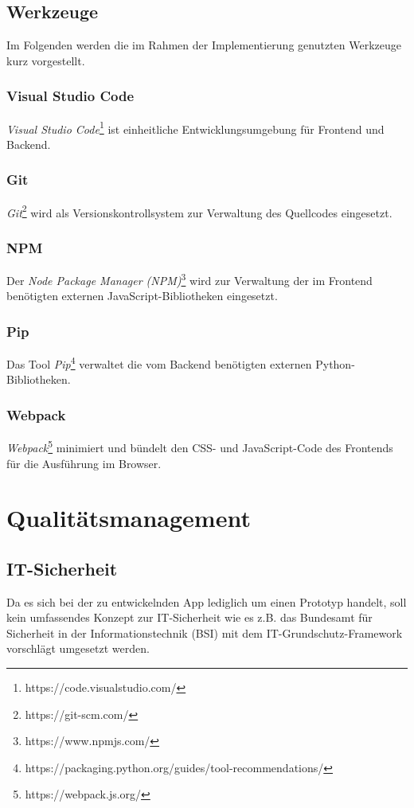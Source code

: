\documentclass[a4paper,11pt,listof=numbered,glossary=totoc,parskip=half,toc=bib]{scrreprt}
\begin{document}
	\section{Werkzeuge}
	Im Folgenden werden die im Rahmen der Implementierung genutzten Werkzeuge kurz vorgestellt.
	
	\subsection{Visual Studio Code}
	\textit{Visual Studio Code}\footnote{https://code.visualstudio.com/} ist einheitliche Entwicklungsumgebung für Frontend und Backend.
	
	\subsection{Git}
	\textit{Git}\footnote{https://git-scm.com/} wird als Versionskontrollsystem zur Verwaltung des Quellcodes eingesetzt.
	
	\subsection{NPM}
	Der \textit{Node Package Manager (NPM)}\footnote{https://www.npmjs.com/} wird zur Verwaltung der im Frontend benötigten externen JavaScript-Bibliotheken eingesetzt.
	
	\subsection{Pip}
	Das Tool \textit{Pip}\footnote{https://packaging.python.org/guides/tool-recommendations/} verwaltet die vom Backend benötigten externen Python-Bibliotheken.
	
	\subsection{Webpack}
	\textit{Webpack}\footnote{https://webpack.js.org/} minimiert und bündelt den CSS- und JavaScript-Code des Frontends für die Ausführung im Browser.
	

	\chapter{Qualitätsmanagement}
	
	\section{IT-Sicherheit}
	Da es sich bei der zu entwickelnden App lediglich um einen Prototyp handelt, soll kein umfassendes Konzept zur IT-Sicherheit wie es z.B. das Bundesamt für Sicherheit in der Informationstechnik (BSI) mit dem IT-Grundschutz-Framework vorschlägt umgesetzt werden.
	
\end{document}

